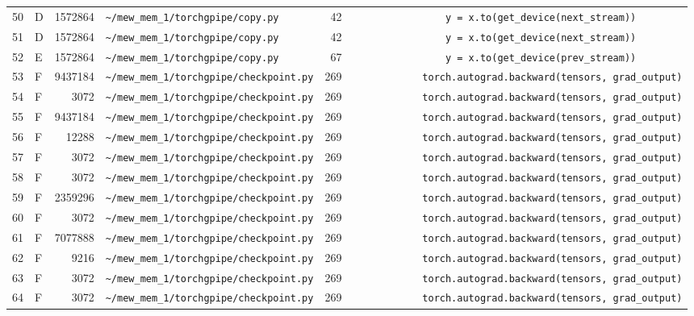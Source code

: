 \documentclass{article}
\begin{document}
\begin{longtable}{r l r p{6.5cm} r p{7.0cm}}
50 & D & 1572864 & \lstinline|~/mew_mem_1/torchgpipe/copy.py| & 42 & \lstinline|                y = x.to(get_device(next_stream))| \\
51 & D & 1572864 & \lstinline|~/mew_mem_1/torchgpipe/copy.py| & 42 & \lstinline|                y = x.to(get_device(next_stream))| \\
52 & E & 1572864 & \lstinline|~/mew_mem_1/torchgpipe/copy.py| & 67 & \lstinline|                y = x.to(get_device(prev_stream))| \\
53 & F & 9437184 & \lstinline|~/mew_mem_1/torchgpipe/checkpoint.py| & 269 & \lstinline|            torch.autograd.backward(tensors, grad_output)| \\
54 & F & 3072 & \lstinline|~/mew_mem_1/torchgpipe/checkpoint.py| & 269 & \lstinline|            torch.autograd.backward(tensors, grad_output)| \\
55 & F & 9437184 & \lstinline|~/mew_mem_1/torchgpipe/checkpoint.py| & 269 & \lstinline|            torch.autograd.backward(tensors, grad_output)| \\
56 & F & 12288 & \lstinline|~/mew_mem_1/torchgpipe/checkpoint.py| & 269 & \lstinline|            torch.autograd.backward(tensors, grad_output)| \\
57 & F & 3072 & \lstinline|~/mew_mem_1/torchgpipe/checkpoint.py| & 269 & \lstinline|            torch.autograd.backward(tensors, grad_output)| \\
58 & F & 3072 & \lstinline|~/mew_mem_1/torchgpipe/checkpoint.py| & 269 & \lstinline|            torch.autograd.backward(tensors, grad_output)| \\
59 & F & 2359296 & \lstinline|~/mew_mem_1/torchgpipe/checkpoint.py| & 269 & \lstinline|            torch.autograd.backward(tensors, grad_output)| \\
60 & F & 3072 & \lstinline|~/mew_mem_1/torchgpipe/checkpoint.py| & 269 & \lstinline|            torch.autograd.backward(tensors, grad_output)| \\
61 & F & 7077888 & \lstinline|~/mew_mem_1/torchgpipe/checkpoint.py| & 269 & \lstinline|            torch.autograd.backward(tensors, grad_output)| \\
62 & F & 9216 & \lstinline|~/mew_mem_1/torchgpipe/checkpoint.py| & 269 & \lstinline|            torch.autograd.backward(tensors, grad_output)| \\
63 & F & 3072 & \lstinline|~/mew_mem_1/torchgpipe/checkpoint.py| & 269 & \lstinline|            torch.autograd.backward(tensors, grad_output)| \\
64 & F & 3072 & \lstinline|~/mew_mem_1/torchgpipe/checkpoint.py| & 269 & \lstinline|            torch.autograd.backward(tensors, grad_output)| \\

\end{longtable}
\end{document}
